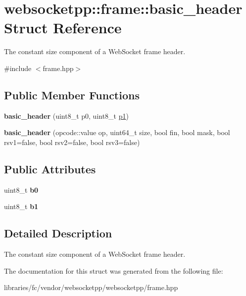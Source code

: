 \hypertarget{structwebsocketpp_1_1frame_1_1basic__header}{}\section{websocketpp\+:\+:frame\+:\+:basic\+\_\+header Struct Reference}
\label{structwebsocketpp_1_1frame_1_1basic__header}


The constant size component of a Web\+Socket frame header.  




{\ttfamily \#include $<$frame.\+hpp$>$}

\subsection*{Public Member Functions}
\begin{DoxyCompactItemize}
\item 
\mbox{\label{structwebsocketpp_1_1frame_1_1basic__header_ae5d978e632e2de210f0282d474870774}} 
{\bfseries basic\+\_\+header} (uint8\+\_\+t p0, uint8\+\_\+t \mbox{\hyperlink{classp1}{p1}})
\item 
\mbox{\label{structwebsocketpp_1_1frame_1_1basic__header_aeacd25eb8ca55f29250dc5aff78a1788}} 
{\bfseries basic\+\_\+header} (opcode\+::value op, uint64\+\_\+t size, bool fin, bool mask, bool rsv1=false, bool rsv2=false, bool rsv3=false)
\end{DoxyCompactItemize}
\subsection*{Public Attributes}
\begin{DoxyCompactItemize}
\item 
\mbox{\label{structwebsocketpp_1_1frame_1_1basic__header_a9dcac77e651c455cf3aed687dbd87d7e}} 
uint8\+\_\+t {\bfseries b0}
\item 
\mbox{\label{structwebsocketpp_1_1frame_1_1basic__header_a631a0cbf798d7996a4de1d62f03cc470}} 
uint8\+\_\+t {\bfseries b1}
\end{DoxyCompactItemize}


\subsection{Detailed Description}
The constant size component of a Web\+Socket frame header. 

The documentation for this struct was generated from the following file\+:\begin{DoxyCompactItemize}
\item 
libraries/fc/vendor/websocketpp/websocketpp/frame.\+hpp\end{DoxyCompactItemize}
